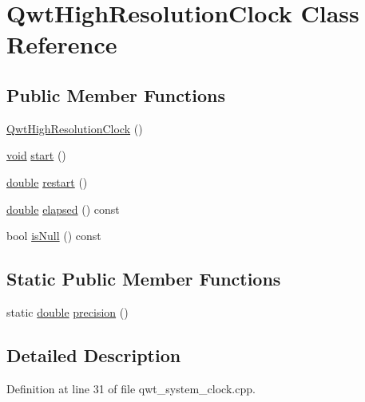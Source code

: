 \hypertarget{class_qwt_high_resolution_clock}{\section{Qwt\-High\-Resolution\-Clock Class Reference}
\label{class_qwt_high_resolution_clock}
}
\subsection*{Public Member Functions}
\begin{DoxyCompactItemize}
\item 
\hyperlink{class_qwt_high_resolution_clock_a2a26603903028bd41b92783d4c665f8d}{Qwt\-High\-Resolution\-Clock} ()
\item 
\hyperlink{group___u_a_v_objects_plugin_ga444cf2ff3f0ecbe028adce838d373f5c}{void} \hyperlink{class_qwt_high_resolution_clock_ac2e9a225b90a24fea73d7318db5e938d}{start} ()
\item 
\hyperlink{_super_l_u_support_8h_a8956b2b9f49bf918deed98379d159ca7}{double} \hyperlink{class_qwt_high_resolution_clock_a0b4b98c50740dc0d11345d693099bf04}{restart} ()
\item 
\hyperlink{_super_l_u_support_8h_a8956b2b9f49bf918deed98379d159ca7}{double} \hyperlink{class_qwt_high_resolution_clock_ab3ed03cb86c9b9e85dfb721f64784237}{elapsed} () const 
\item 
bool \hyperlink{class_qwt_high_resolution_clock_a572f3b53e4ba51f93d0defc0e7232e92}{is\-Null} () const 
\end{DoxyCompactItemize}
\subsection*{Static Public Member Functions}
\begin{DoxyCompactItemize}
\item 
static \hyperlink{_super_l_u_support_8h_a8956b2b9f49bf918deed98379d159ca7}{double} \hyperlink{class_qwt_high_resolution_clock_acd23ddd17fe15c113cb5b486a62627e9}{precision} ()
\end{DoxyCompactItemize}


\subsection{Detailed Description}


Definition at line 31 of file qwt\-\_\-system\-\_\-clock.\-cpp.



